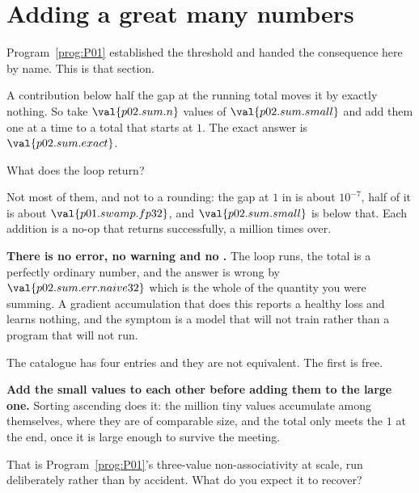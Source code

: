 \section{Adding a great many numbers}
\label{sec:P02-summation}

\begin{fr}
Program~\ref{prog:P01} established the threshold and handed the consequence
here by name. This is that section.

A contribution below half the gap at the running total moves it by exactly
nothing. So take $\val{p02.sum.n}$ values of $\val{p02.sum.small}$ and add them
one at a time to a  total that starts at $1$. The exact answer is
$\val{p02.sum.exact}$.

What does the loop return?
\nextframe
\end{fr}

\begin{fr}
Not most of them, and not to a rounding: the gap at $1$ in  is
about $10^{-7}$, half of it is about $\val{p01.swamp.fp32}$, and
$\val{p02.sum.small}$ is below that. Each addition is a no-op that returns
successfully, a million times over.

\begin{warning}
\textbf{There is no error, no warning and no .} The loop runs, the
total is a perfectly ordinary number, and the answer is wrong by
$\val{p02.sum.err.naive32}$ \dash{} which is the whole of the quantity you were
summing. A gradient accumulation that does this reports a healthy loss and
learns nothing, and the symptom is a model that will not train rather than a
program that will not run.
\end{warning}
\end{fr}

\begin{fr}
The catalogue has four entries and they are not equivalent. The first is free.

\textbf{Add the small values to each other before adding them to the large
one.} Sorting ascending does it: the million tiny values accumulate among
themselves, where they are of comparable size, and the total only meets the $1$
at the end, once it is large enough to survive the meeting.

That is Program~\ref{prog:P01}'s three-value non-associativity at scale, run
deliberately rather than by accident. What do you expect it to recover?
\nextframe
\end{fr}

